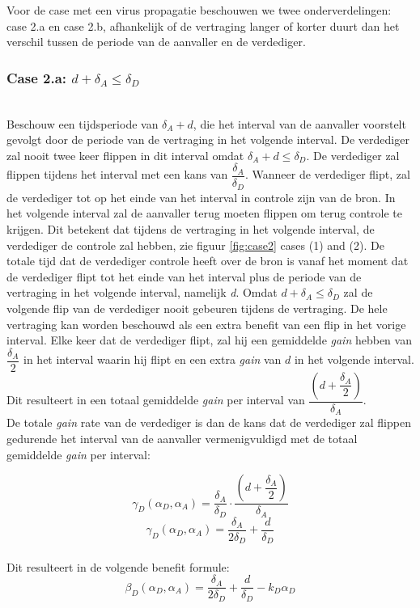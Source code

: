 \documentclass[master=cws, masteroption=vs,english]{kulemt}
\begin{document}
\begin{abstract*}
Voor de case met een virus propagatie beschouwen we twee onderverdelingen: case 2.a en case 2.b, afhankelijk of de vertraging langer of korter duurt dan het verschil tussen de periode van de aanvaller en de verdediger.\\


\subsubsection*{\textbf{Case 2.a:} $d + \delta_{A} \leq \delta_{D}$}
~~\\
Beschouw een tijdsperiode van $\delta_{A} + d$, die het interval van de aanvaller voorstelt gevolgt door de periode van de vertraging in het volgende interval. De verdediger zal nooit twee keer flippen in dit interval omdat  $\delta_{A} + d \leq \delta_{D}$. De verdediger zal flippen tijdens het interval met een kans van $\dfrac{\delta_{A}}{\delta_{D}} $. Wanneer de verdediger flipt, zal de verdediger tot op het einde van het interval in controle zijn van de bron. In het volgende interval zal de aanvaller terug moeten flippen om terug controle te krijgen. Dit betekent dat tijdens de vertraging in het volgende interval, de verdediger de controle zal hebben, zie figuur  \ref{fig:case2} cases (1) and (2). De totale tijd dat de verdediger controle heeft over de bron is vanaf het moment dat de verdediger flipt tot het einde van het interval plus de periode van de vertraging in het volgende interval, namelijk \textit{d}. Omdat $d + \delta_{A} \leq \delta_{D}$  zal de volgende flip van de verdediger nooit gebeuren tijdens de vertraging. De hele vertraging kan worden beschouwd als een extra benefit van een flip in het vorige interval.
Elke keer dat de verdediger flipt, zal hij een gemiddelde \textit{gain} hebben van $\dfrac{\delta_{A}}{2}$ in het interval waarin hij flipt en een extra \textit{gain} van $d$ in het volgende interval. Dit resulteert in een totaal gemiddelde \textit{gain} per interval van
$\dfrac{(d+\dfrac{\delta_{A}}{2})}{\delta_{A}}$. \\

De totale \textit{gain} rate van de verdediger is dan de kans dat de verdediger zal flippen gedurende het interval van de aanvaller vermenigvuldigd met de totaal gemiddelde \textit{gain} per interval:


\begin{equation}\label{first}
\gamma_{D}(\alpha_{D},\alpha_{A}) = \dfrac{\delta_{A}}{\delta_{D}} \cdot \dfrac{(d+\dfrac{\delta_{A}}{2})}{\delta_{A}} 
\end{equation}
\begin{equation}\label{first}
\gamma_{D}(\alpha_{D},\alpha_{A}) = \dfrac{\delta_{A}}{2\delta_{D}} + \dfrac{d}{\delta_{D}} 
\end{equation}\\
Dit resulteert in de volgende benefit formule:
\begin{equation}\label{first}
\beta_{D}(\alpha_{D},\alpha_{A}) = \dfrac{\delta_{A}}{2\delta_{D}} + \dfrac{d}{\delta_{D}} - k_{D} \alpha_{D} 
\end{equation}\\


\end{abstract*}
\end{document}
